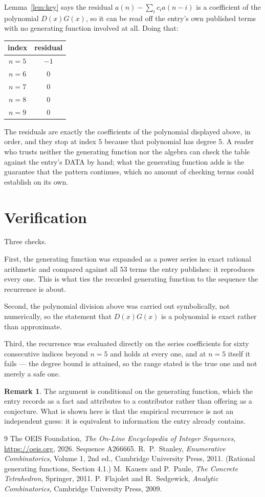 \documentclass[11pt,a4paper]{article}
\theoremstyle{plain}
\theoremstyle{definition}
\newtheorem{remark}[theorem]{Remark}
\begin{document}
Lemma~\ref{lem:key} says the residual $a(n)-\sum_ic_ia(n-i)$ is a coefficient of the
polynomial $D(x)G(x)$, so it can be read off the entry's own published terms with no
generating function involved at all. Doing that:
\begin{center}
\begin{tabular}{cc}
index & residual \\ \hline
$n=5$ & $-1$ \\
$n=6$ & $0$ \\
$n=7$ & $0$ \\
$n=8$ & $0$ \\
$n=9$ & $0$
\end{tabular}
\end{center}
The residuals are exactly the coefficients of the polynomial displayed above, in order, and
they stop at index $5$ because that polynomial has degree $5$. A reader who trusts
neither the generating function nor the algebra can check the table against the entry's DATA
by hand; what the generating function adds is the guarantee that the pattern continues, which
no amount of checking terms could establish on its own.

\section{Verification}

Three checks.

First, the generating function was expanded as a power series in exact rational arithmetic and
compared against all $53$ terms the entry publishes: it reproduces every one. This is
what ties the recorded generating function to the sequence the recurrence is about.

Second, the polynomial division above was carried out symbolically, not numerically, so the
statement that $D(x)G(x)$ is a polynomial is exact rather than approximate.

Third, the recurrence was evaluated directly on the series coefficients for sixty consecutive
indices beyond $n=5$ and holds at every one, and at $n=5$ itself it fails --- the
degree bound is attained, so the range stated is the true one and not merely a safe one.

\begin{remark}
The argument is conditional on the generating function, which the entry records as a fact and
attributes to a contributor rather than offering as a conjecture. What is shown here is that
the empirical recurrence is not an independent guess: it is equivalent to information the
entry already contains.
\end{remark}

\begin{thebibliography}{9}
 The OEIS Foundation, \emph{The On-Line Encyclopedia of Integer
Sequences}, \url{https://oeis.org}, 2026. Sequence A266665.
 R.~P.~Stanley, \emph{Enumerative Combinatorics}, Volume 1, 2nd ed.,
Cambridge University Press, 2011. (Rational generating functions, Section 4.1.)
 M.~Kauers and P.~Paule, \emph{The Concrete Tetrahedron}, Springer, 2011.
 P.~Flajolet and R.~Sedgewick, \emph{Analytic Combinatorics}, Cambridge
University Press, 2009.
\end{thebibliography}
\end{document}
